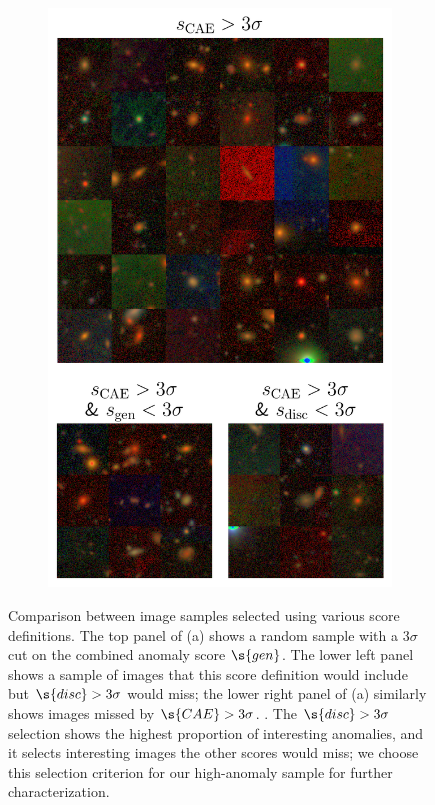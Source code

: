 \begin{figure}
\begin{subfigure}{0.33\textwidth}
  \includegraphics[width=0.95\linewidth]{score_effect_ae.png} 
  \caption{}
  \label{fig:score_effect_ae}
\end{subfigure}

\caption{Comparison between image samples selected using various score definitions. The top panel of (a) shows a random sample with a 3$\sigma$ cut on the combined anomaly score $\s{gen}$. The lower left panel shows a sample of images that this score definition would include but $\s{disc}>3\sigma$ would miss; the lower right panel of (a) similarly shows images missed by $\s{CAE}>3\sigma$. . The $\s{disc}>3\sigma$ selection shows the highest proportion of interesting anomalies, and it selects interesting images the other scores would miss; we choose this selection criterion for our high-anomaly sample for further characterization.}
\label{fig:score_effect}
\end{figure}


